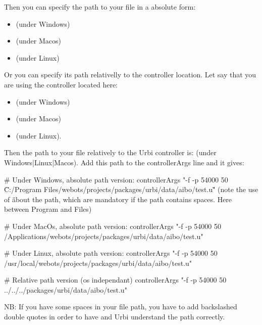 Then you can specify the path to your file in a absolute form:
\begin{itemize}
\item {}
  (under Windows)
\item {}
  (under Macos)
\item {}
  (under Linux)
\end{itemize}

Or you can specify its path relativelly to the \urbi controller
location.  Let say that you are using the \urbi controller located
here:
\begin{itemize}
\item {}
  (under Windows)
\item
  (under Macos)
\item {}
  (under Linux).
\end{itemize}

Then the path to your file relatively to the Urbi controller is:
 (under
Windows|Linux|Macos).  Add this path to the controllerArgs line and it
gives:

\begin{shell}
# Under Windows, absolute path version:
controllerArgs "-f -p 54000 50 \"C:/Program Files/webots/projects/packages/urbi/data/aibo/test.u\""
(note the use of \" \" about the path, which are mandatory if the path
contains spaces. Here between Program and Files)

# Under MacOs, absolute path version:
controllerArgs "-f -p 54000 50 /Applications/webots/projects/packages/urbi/data/aibo/test.u"

# Under Linux, absolute path version:
controllerArgs "-f -p 54000 50 /usr/local/webots/projects/packages/urbi/data/aibo/test.u"

# Relative path version (os independant)
controllerArgs "-f -p 54000 50 ../../../packages/urbi/data/aibo/test.u"
\end{shell}

NB: If you have some spaces in your file path, you have to add
backslashed double quotes in order to have \webots and Urbi understand
the path correctly.

